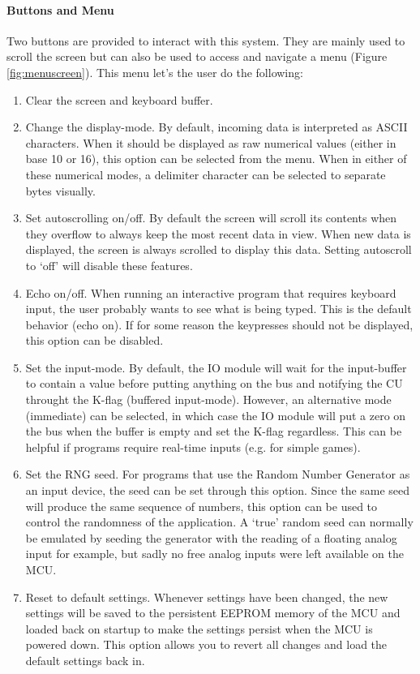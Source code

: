 \paragraph{Buttons and Menu} Two buttons are provided to interact with this system. They are mainly used to scroll the screen but can also be used to access and navigate a menu (Figure \ref{fig:menuscreen}). This menu let's the user do the following:
\begin{enumerate}
\item Clear the screen and keyboard buffer.
\item Change the display-mode. By default, incoming data is interpreted as ASCII characters. When it should be displayed as raw numerical values (either in base 10 or 16), this option can be selected from the menu. When in either of these numerical modes, a delimiter character can be selected to separate bytes visually.
\item Set autoscrolling on/off. By default the screen will scroll its contents when they overflow to always keep the most recent data in view. When new data is displayed, the screen is always scrolled to display this data. Setting autoscroll to `off' will disable these features.
\item Echo on/off. When running an interactive program that requires keyboard input, the user probably wants to see what is being typed. This is the default behavior (echo on). If for some reason the keypresses should not be displayed, this option can be disabled.
\item Set the input-mode. By default, the IO module will wait for the input-buffer to contain a value before putting anything on the bus and notifying the CU throught the K-flag (buffered input-mode). However, an alternative mode (immediate) can be selected, in which case the IO module will put a zero on the bus when the buffer is empty and set the K-flag regardless. This can be helpful if programs require real-time inputs (e.g. for simple games).
\item Set the RNG seed. For programs that use the Random Number Generator as an input device, the seed can be set through this option. Since the same seed will produce the same sequence of numbers, this option can be used to control the randomness of the application. A `true' random seed can normally be emulated by seeding the generator with the reading of a floating analog input for example, but sadly no free analog inputs were left available on the MCU.
\item Reset to default settings. Whenever settings have been changed, the new settings will be saved to the persistent EEPROM memory of the MCU and loaded back on startup to make the settings persist when the MCU is powered down. This option allows you to revert all changes and load the default settings back in.
\end{enumerate}

